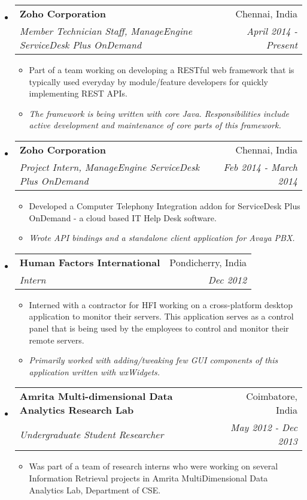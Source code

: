 \documentclass[letterpaper,11pt]{article}
\makeatletter
\newcommand{\resitem}[1]{\item #1 \vspace{-2pt}}
\newcommand{\resheading}[1]{\textbf{\sffamily{\mbox{~}{\large #1} \vphantom{p\^{E}}}}}
\newcommand{\ressubheading}[4]{
\begin{tabular*}{6.5in}{l@{\extracolsep{\fill}}r}
		\textbf{#1} & #2 \\
		\textit{#3} & \textit{#4} \\
\end{tabular*}\vspace{-6pt}}
\makeatother
\begin{document}
\vspace{0.05in}
\resheading{Work Experience}
\begin{itemize}
\item[]
	\ressubheading{Zoho Corporation}{Chennai, India}{Member Technician Staff, ManageEngine ServiceDesk Plus OnDemand}{April 2014 - Present}
	\begin{itemize}
		\resitem{Part of a team working on developing a RESTful web framework that is typically used everyday by module/feature developers for quickly implementing REST APIs.}
		\resitem{\textit{The framework is being written with core Java. Responsibilities include active development and maintenance of core parts of this framework.}}
	\end{itemize}

\item[]
	\ressubheading{Zoho Corporation}{Chennai, India}{Project Intern, ManageEngine ServiceDesk Plus OnDemand}{Feb 2014 - March 2014}
	\begin{itemize}
		\resitem{Developed a Computer Telephony Integration addon for ServiceDesk Plus OnDemand - a cloud based IT Help Desk software.}
		\resitem{\textit{Wrote API bindings and a standalone client application for Avaya PBX.}}
	\end{itemize}

\item[]
	\ressubheading{Human Factors International}{Pondicherry, India}{Intern}{Dec 2012}
	\begin{itemize}
		\resitem{Interned with a contractor for HFI working on a cross-platform desktop application to monitor their servers. This application serves as a control panel that is being used by the employees to control and monitor their remote servers.}
        \resitem{\textit{Primarily worked with adding/tweaking few GUI components of this application written with wxWidgets.}}
	\end{itemize}

\item[]
	\ressubheading{Amrita Multi-dimensional Data Analytics Research Lab}{Coimbatore, India}{Undergraduate Student Researcher}{May 2012 - Dec 2013}
	\begin{itemize}
		\resitem{Was part of a team of research interns who were working on several Information Retrieval projects in Amrita MultiDimensional Data Analytics Lab, Department of CSE.}
	\end{itemize}

\end{itemize}
\end{document}
